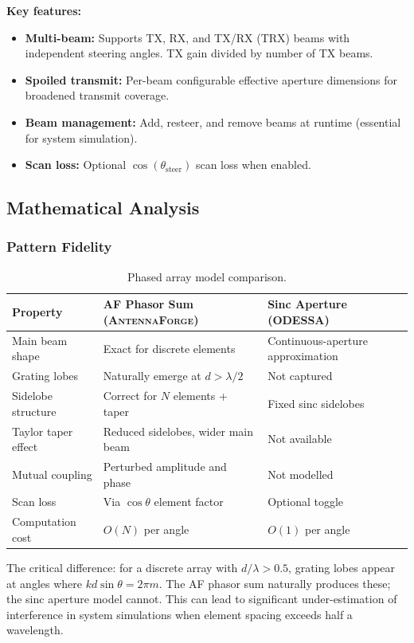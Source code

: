 \documentclass[11pt,a4paper]{article}
\newcommand{\AF}{\textsc{AntennaForge}}
\newcommand{\OD}{\textsc{ODESSA}}
\begin{document}
\textbf{Key features:}
\begin{itemize}[leftmargin=2em]
  \item \textbf{Multi-beam:} Supports TX, RX, and TX/RX (TRX) beams with
    independent steering angles. TX gain divided by number of TX beams.
  \item \textbf{Spoiled transmit:} Per-beam configurable effective aperture
    dimensions for broadened transmit coverage.
  \item \textbf{Beam management:} Add, resteer, and remove beams at runtime
    (essential for system simulation).
  \item \textbf{Scan loss:} Optional $\cos(\theta_{\text{steer}})$ scan loss
    when enabled.
\end{itemize}

\subsection{Mathematical Analysis}

\subsubsection{Pattern Fidelity}

\begin{table}[H]
\centering
\caption{Phased array model comparison.}
\small
\begin{tabularx}{\textwidth}{l X X}
\toprule
\textbf{Property} & \textbf{AF Phasor Sum (\AF{})} & \textbf{Sinc Aperture (\OD{})} \\
\midrule
Main beam shape & Exact for discrete elements & Continuous-aperture approximation \\
Grating lobes & Naturally emerge at $d > \lambda/2$ & Not captured \\
Sidelobe structure & Correct for $N$ elements + taper & Fixed sinc sidelobes \\
Taylor taper effect & Reduced sidelobes, wider main beam & Not available \\
Mutual coupling & Perturbed amplitude and phase & Not modelled \\
Scan loss & Via $\cos\theta$ element factor & Optional toggle \\
Computation cost & $O(N)$ per angle & $O(1)$ per angle \\
\bottomrule
\end{tabularx}
\end{table}

The critical difference: for a discrete array with $d/\lambda > 0.5$, grating
lobes appear at angles where $kd\sin\theta = 2\pi m$.  The AF phasor sum
naturally produces these; the sinc aperture model cannot.  This can lead to
significant under-estimation of interference in system simulations when
element spacing exceeds half a wavelength.
\end{document}
